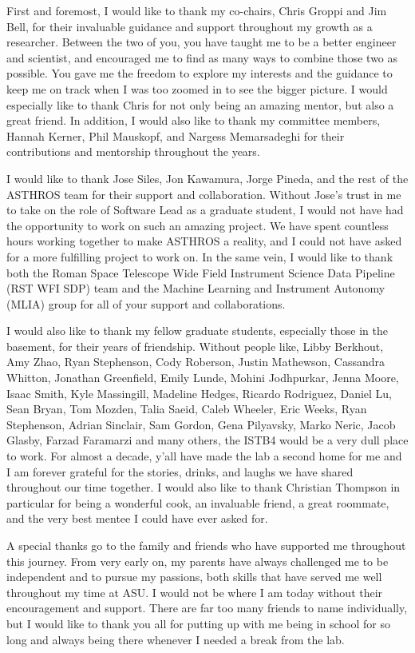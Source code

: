 First and foremost, I would like to thank my co-chairs, Chris Groppi and Jim Bell, for their invaluable guidance and support throughout my growth as a researcher.
Between the two of you, you have taught me to be a better engineer and scientist, and encouraged me to find as many ways to combine those two as possible.
You gave me the freedom to explore my interests and the guidance to keep me on track when I was too zoomed in to see the bigger picture.
I would especially like to thank Chris for not only being an amazing mentor, but also a great friend.
In addition, I would also like to thank my committee members, Hannah Kerner, Phil Mauskopf, and Nargess Memarsadeghi for their contributions and mentorship throughout the years. 

I would like to thank Jose Siles, Jon Kawamura, Jorge Pineda, and the rest of the ASTHROS team for their support and collaboration.
Without Jose's trust in me to take on the role of Software Lead as a graduate student, I would not have had the opportunity to work on such an amazing project.
We have spent countless hours working together to make ASTHROS a reality, and I could not have asked for a more fulfilling project to work on.
In the same vein, I would like to thank both the Roman Space Telescope Wide Field Instrument Science Data Pipeline (RST WFI SDP) team and the Machine Learning and Instrument Autonomy (MLIA) group for all of your support and collaborations.

I would also like to thank my fellow graduate students, especially those in the basement, for their years of friendship.
Without people like, Libby Berkhout, Amy Zhao, Ryan Stephenson, Cody Roberson, Justin Mathewson, Cassandra Whitton, Jonathan Greenfield, Emily Lunde, Mohini Jodhpurkar, Jenna Moore, Isaac Smith, Kyle Massingill, Madeline Hedges, Ricardo Rodriguez, Daniel Lu, Sean Bryan, Tom Mozden, Talia Saeid, Caleb Wheeler, Eric Weeks, Ryan Stephenson, Adrian Sinclair, Sam Gordon, Gena Pilyavsky, Marko Neric, Jacob Glasby, Farzad Faramarzi and many others, the ISTB4 would be a very dull place to work. 
For almost a decade, y'all have made the lab a second home for me and I am forever grateful for the stories, drinks, and laughs we have shared throughout our time together.
I would also like to thank Christian Thompson in particular for being a wonderful cook, an invaluable friend, a great roommate, and the very best mentee I could have ever asked for.

A special thanks go to the family and friends who have supported me throughout this journey. 
From very early on, my parents have always challenged me to be independent and to pursue my passions, both skills that have served me well throughout my time at ASU.
I would not be where I am today without their encouragement and support.
There are far too many friends to name individually, but I would like to thank you all for putting up with me being in school for so long and always being there whenever I needed a break from the lab.

